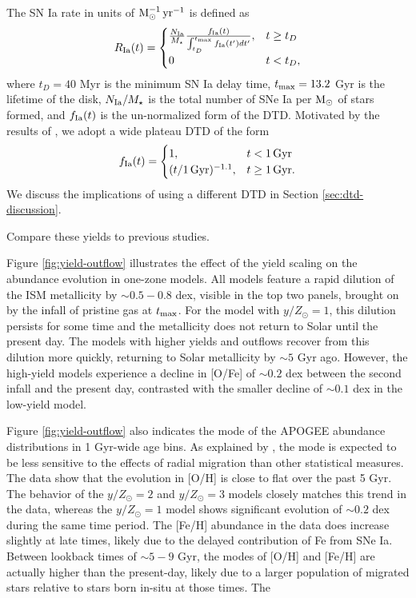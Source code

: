 \documentclass[twocolumn,twocolappendix,linenumbers]{aastex631}
\newcommand{\todo}[1]{{\color{red}#1}}
\begin{document}
The SN Ia rate in units of ${\rm M}_\odot^{-1}\,{\rm yr}^{-1}$ is defined as
\begin{equation}
    R_{\rm Ia}(t) = 
    \begin{cases}
        \frac{N_{\rm Ia}}{M_\star}
        \frac{f_{\rm Ia}(t)}{\int_{t_D}^{t_{\rm max}} f_{\rm Ia}(t') dt'}, & t \ge t_D \\
        0 & t < t_D,
    \end{cases}
    \label{eq:dtd-function}
\end{equation}
where $t_D=40$ Myr is the minimum SN Ia delay time, $t_{\rm max}=13.2$ Gyr is the lifetime of the disk, $N_{\rm Ia}/M_\star$ is the total number of SNe Ia per ${\rm M}_\odot$ of stars formed, and $f_{\rm Ia}(t)$ is the un-normalized form of the DTD. Motivated by the results of \citet{dubay_galactic_2024}, we adopt a wide plateau DTD of the form
\begin{equation}
    \label{eq:plateau-dtd}
    f_{\rm Ia}(t) =
    \begin{cases}
        1, & t < 1\,{\rm Gyr} \\
        (t/1\,{\rm Gyr})^{-1.1}, & t \ge 1\,{\rm Gyr}.
    \end{cases}
\end{equation}
We discuss the implications of using a different DTD in Section \ref{sec:dtd-discussion}.

\todo{Compare these yields to previous studies.}

Figure \ref{fig:yield-outflow} illustrates the effect of the yield scaling on the abundance evolution in one-zone models. All models feature a rapid dilution of the ISM metallicity by $\sim0.5-0.8$ dex, visible in the top two panels, brought on by the infall of pristine gas at $t_{\rm max}$. For the model with $y/Z_\odot=1$, this dilution persists for some time and the metallicity does not return to Solar until the present day. The models with higher yields and outflows recover from this dilution more quickly, returning to Solar metallicity by $\sim5$ Gyr ago. However, the high-yield models experience a decline in [O/Fe] of $\sim0.2$ dex between the second infall and the present day, contrasted with the smaller decline of $\sim0.1$ dex in the low-yield model.

Figure \ref{fig:yield-outflow} also indicates the mode of the APOGEE abundance distributions in 1 Gyr-wide age bins. As explained by \citet{johnson_milky_2024}, the mode is expected to be less sensitive to the effects of radial migration than other statistical measures. The data show that the evolution in [O/H] is close to flat over the past 5 Gyr. The behavior of the $y/Z_\odot=2$ and $y/Z_\odot=3$ models closely matches this trend in the data, whereas the $y/Z_\odot=1$ model shows significant evolution of $\sim0.2$ dex during the same time period. The [Fe/H] abundance in the data does increase slightly at late times, likely due to the delayed contribution of Fe from SNe Ia. Between lookback times of $\sim5-9$ Gyr, the modes of [O/H] and [Fe/H] are actually higher than the present-day, likely due to a larger population of migrated stars relative to stars born in-situ at those times. The 
\end{document}
